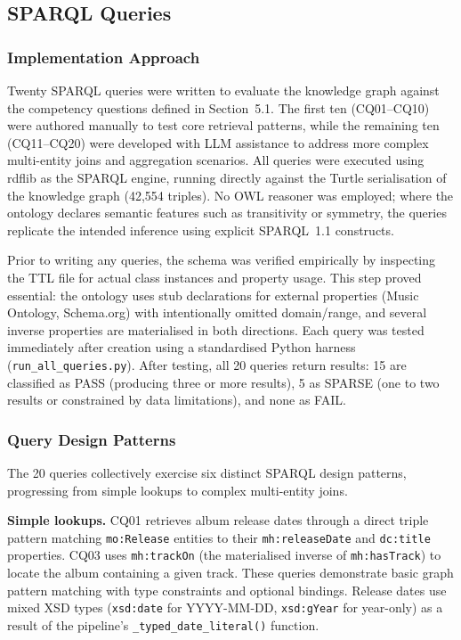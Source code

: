 \subsection{SPARQL Queries}

\subsubsection{Implementation Approach}

Twenty SPARQL queries were written to evaluate the knowledge graph against the competency questions defined in Section~5.1. The first ten (CQ01--CQ10) were authored manually to test core retrieval patterns, while the remaining ten (CQ11--CQ20) were developed with LLM assistance to address more complex multi-entity joins and aggregation scenarios. All queries were executed using rdflib as the SPARQL engine, running directly against the Turtle serialisation of the knowledge graph (42,554 triples). No OWL reasoner was employed; where the ontology declares semantic features such as transitivity or symmetry, the queries replicate the intended inference using explicit SPARQL~1.1 constructs.

Prior to writing any queries, the schema was verified empirically by inspecting the TTL file for actual class instances and property usage. This step proved essential: the ontology uses stub declarations for external properties (Music Ontology, Schema.org) with intentionally omitted domain/range, and several inverse properties are materialised in both directions. Each query was tested immediately after creation using a standardised Python harness (\texttt{run\_all\_queries.py}). After testing, all 20 queries return results: 15 are classified as PASS (producing three or more results), 5 as SPARSE (one to two results or constrained by data limitations), and none as FAIL.

\subsubsection{Query Design Patterns}

The 20 queries collectively exercise six distinct SPARQL design patterns, progressing from simple lookups to complex multi-entity joins.

\textbf{Simple lookups.} CQ01 retrieves album release dates through a direct triple pattern matching \texttt{mo:Release} entities to their \texttt{mh:releaseDate} and \texttt{dc:title} properties. CQ03 uses \texttt{mh:trackOn} (the materialised inverse of \texttt{mh:hasTrack}) to locate the album containing a given track. These queries demonstrate basic graph pattern matching with type constraints and optional bindings. Release dates use mixed XSD types (\texttt{xsd:date} for YYYY-MM-DD, \texttt{xsd:gYear} for year-only) as a result of the pipeline's \texttt{\_typed\_date\_literal()} function.

